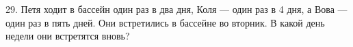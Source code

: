 29. Петя ходит в бассейн один раз в два дня, Коля --- один раз в 4 дня, а Вова --- один раз в пять дней. Они встретились в бассейне во вторник. В какой день недели они встретятся вновь?\\
